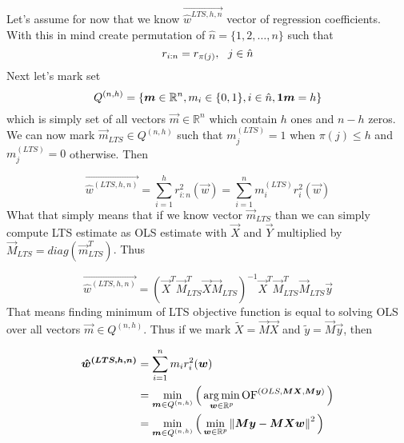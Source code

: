Let's assume for now that we know $\vec{\hat{w}^{LTS, h, n}}$ vector of regression coefficients. With this in mind create permutation of $\hat{n} = \{{1,2,\ldots, n\}}$ such that 
\begin{equation}
    r_{i:n} = r_{\pi(j)}\\, \ \ j \in \hat{n}
\end{equation}
Next let's mark set
 \begin{equation}
   Q^{(n,h)} = \{{\vec{m} \in \mathbb{R}^n \\, m_i \in \{{0, 1\}} \\,i \in \hat{n} \\, \vec{1}\vec{m} = h \}}
\end{equation}
which is simply set of all vectors $\vec{m} \in \mathbb{R}^n$ which contain $h$ ones and $n-h$ zeros. We can now mark $\vec{m}_{LTS} \in Q^{(n,h)}$  such that  $m^{(LTS)}_j = 1$ when $\pi(j) \leq h$ and $m^{(LTS)}_j = 0$ otherwise. Then

\begin{equation} \label{ltshat}
    \vec{\hat{w}^{(LTS, h, n)}} =  \sum\limits_{i=1}^h r_{i:n}^2(\vec{w}) =  \sum\limits_{i=1}^n 
    m^{(LTS)}_i r_{i}^2(\vec{w})
\end{equation}
What that simply means that if we know vector $\vec{m}_{LTS}$ than we can simply compute LTS estimate as OLS estimate with $\vec{X}$ and $\vec{Y}$ multiplied by $\vec{M}_{LTS} = diag(\vec{m}^T_{LTS})$. Thus 

\begin{equation} 
    \vec{\hat{w}^{(LTS, h, n)}} = (\vec{X}^T\vec{M}^T_{LTS}\vec{X}\vec{M}_{LTS})^{-1}\vec{X}^T\vec{M}^T_{LTS}\vec{M}_{LTS}\vec{y}
\end{equation}
That means finding minimum of LTS objective function is equal to solving OLS over all vectors 
$\vec{m} \in Q^{(n,h)}$. Thus if we mark $\tilde{X} = \vec{M}\vec{X} $ and $\tilde{y} = \vec{M}\vec{y} $, then

\begin{align*} 
    \vec{\hat{w}^{(LTS, h, n)}}
     &=  \sum\limits_{i=1}^n 
     m_i r_{i}^2(\vec{w})\\
    &= \minim_{\vec{m} \in Q^{(n,h)}} 
    \Big( \argmin_{\vec{w} \in\mathbb{R}^p} 
    \of^{(OLS,\vec{M}\vec{X},  \vec{M}\vec{y} )} \Big)\\
    &= \minim_{\vec{m} \in Q^{(n,h)}} 
    \Big(\minim_{\vec{w} \in\mathbb{R}^p}  \norm{ \vec{M}\vec{y} -   \vec{M}\vec{X}\vec{w}  }^2 \Big)
\end{align*}

